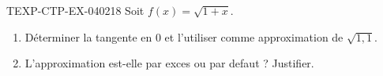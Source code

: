 \begin{exercice}{TEXP-CTP-EX-040}{2}{18}
Soit $f(x) = \sqrt{1+x}$.
\begin{enumerate}
  \item Déterminer la tangente en $0$ et l'utiliser comme approximation de $\sqrt{1{,}1}$.
  \item L'approximation est-elle par exces ou par defaut ? Justifier.
\end{enumerate}

\end{exercice}
